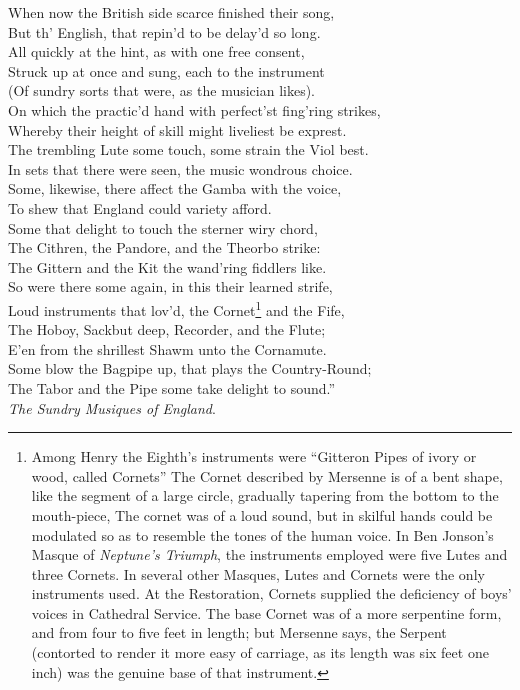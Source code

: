 \settowidth{\versewidth}{On which the practic’d hand with perfect’st fing’ring strikes,}
\begin{scverse}
When now the British side scarce finished their song,\\
But th’ English, that repin’d to be delay’d so long.\\
All quickly at the hint, as with one free consent,\\
Struck up at once and sung, each to the instrument\\
(Of sundry sorts that were, as the musician likes).\\
On which the practic’d hand with perfect’st fing’ring strikes,\\
Whereby their height of skill might liveliest be exprest.\\
The trembling Lute some touch, some strain the Viol best.\\
In sets that there were seen, the music wondrous choice.\\
Some, likewise, there affect the Gamba with the voice,\\
To shew that England could variety afford.\\
Some that delight to touch the sterner wiry chord,\\
The Cithren, the Pandore, and the Theorbo strike:\\
The Gittern and the Kit the wand’ring fiddlers like.\\
So were there some again, in this their learned strife,\\
Loud instruments that lov’d, the Cornet\footnote{\textit{}
Among Henry the Eighth’s instruments were “Gitteron
Pipes of ivory or wood, called Cornets” The Cornet
described by Mersenne is of a bent shape, like the segment
of a large circle, gradually tapering from the bottom to
the mouth-piece, The cornet was of a loud sound, but
in skilful hands could be modulated so as to resemble the
tones of the human voice. In Ben Jonson’s Masque of
\textit{Neptune’s Triumph}, the instruments employed were five
Lutes and three Cornets. In several other Masques, Lutes
and Cornets were the only instruments used. At the
Restoration, Cornets supplied the deficiency of boys'
voices in Cathedral Service. The base Cornet was of a
more serpentine form, and from four to five feet in length;
but Mersenne says, the Serpent (contorted to render it
more easy of carriage, as its length was six feet one inch)
was the genuine base of that instrument.}
and the Fife,\\
The Hoboy, Sackbut deep, Recorder, and the Flute;\\
E’en from the shrillest Shawm unto the Cornamute.\\
Some blow the Bagpipe up, that plays the Country-Round;\\
The Tabor and the Pipe some take delight to sound.”\\
\attribution \textit{ The Sundry Musiques of England}.
\end{scverse}

